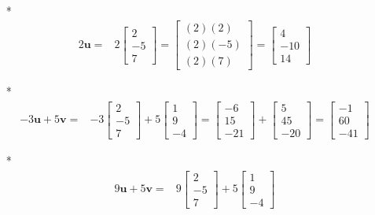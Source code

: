 \documentclass{article}
\begin{document}
\begin{itemize}
\begin{align*}
\end{align*}
\item[*] \begin{align*}
2\mathbf{u} = & 2 \begin{bmatrix} 2 \\ -5 \\ 7 \end{bmatrix} = \begin{bmatrix} (2)(2) \\ (2)(-5) \\ (2)(7) \end{bmatrix} = \begin{bmatrix} 4 \\ -10 \\ 14 \end{bmatrix}
\end{align*}    
\item[*] \begin{align*}
-3\mathbf{u} + 5\mathbf{v} = & -3\begin{bmatrix} 2 \\ -5 \\ 7 \end{bmatrix} + 5\begin{bmatrix} 1 \\ 9 \\ -4 \end{bmatrix} 
= \begin{bmatrix} -6 \\ 15 \\ -21 \end{bmatrix} + \begin{bmatrix} 5 \\ 45 \\ -20 \end{bmatrix}
= \begin{bmatrix} -1 \\ 60 \\ -41 \end{bmatrix} 
\end{align*}
\item[*] \begin{align*}
9\mathbf{u} + 5\mathbf{v} = & 9\begin{bmatrix} 2 \\ -5 \\ 7 \end{bmatrix} + 5\begin{bmatrix} 1 \\ 9 \\ -4 \end{bmatrix} 

\end{align*}
\end{itemize}
\end{document}
